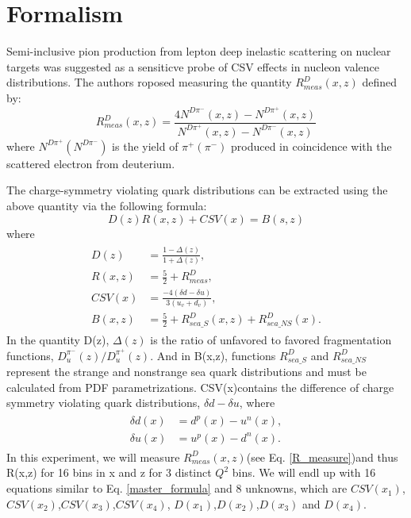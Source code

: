 \documentclass[12pt]{article}
\begin{document}
\section{Formalism}

Semi-inclusive pion production from lepton deep inelastic scattering on nuclear targets was suggested\cite{Baldit:1994jk, PhysRevLett.80.3715,PhysRevD.64.052002} as a sensiticve probe of CSV effects in nucleon valence distributions. The authors roposed measuring the quantity $R^D_{meas} (x,z) $ defined by:
\begin{equation}\label{R_measure}
    R^D_{meas}(x,z) = \frac{4N^{D\pi^-}(x,z) - N^{D\pi^+}(x,z)}{N^{D\pi^+}(x,z)-N^{D\pi^-}(x,z)}
\end{equation}
where $N^{D\pi^+}(N^{D\pi^-})$ is the yield of $\pi^+(\pi^-)$ produced in coincidence with the scattered electron from deuterium. 

The charge-symmetry violating quark distributions can be extracted using the above quantity via the following formula:
\begin{equation}\label{master_formula}
    D(z)R(x,z)+CSV(x) = B(s,z)
\end{equation}
where
\begin{align}
\begin{split}
    D(z) &=\frac{1-\Delta(z)}{1+\Delta(z)}, \\
    R(x,z) &= \frac{5}{2} +R^D_{meas}, \\
    CSV(x) &= \frac{-4(\delta d - \delta u)}{3(u_v+d_v)}, \\
    B(x,z) &= \frac{5}{2} + R^D_{sea\_S}(x,z)+R^D_{sea\_NS}(x).
\end{split}        
\end{align}
In the quantity D(z), $\Delta(z)$ is the ratio of unfavored to favored fragmentation functions, $D^{\pi^-}_u(z)/D^{\pi^+}_u(z)$. And in B(x,z), functions $R^D_{sea\_S}$ and $R^D_{sea\_NS}$ represent the strange and nonstrange sea quark distributions and must be calculated from PDF parametrizations. CSV(x)contains the difference of charge symmetry violating quark distributions, $\delta d-\delta u$, where
\begin{align}\label{CSV(X)}
    \begin{split}
          \delta d(x) &= d^p(x) - u^n(x), \\
          \delta u(x) &= u^p(x) - d^n(x).
    \end{split}
\end{align}
 In this experiment, we will measure $R^D_{meas}(x,z)$(see Eq. \eqref{R_measure})and thus R(x,z) for 16 bins in x and z for 3 distinct $Q^2$ bins. We will endl up with 16 equations similar to Eq. \eqref{master_formula} and 8 unknowns, which are $CSV(x_1)$,$CSV(x_2)$,$CSV(x_3)$,$CSV(x_4)$, $D(x_1)$,$D(x_2)$,$D(x_3)$ and $D(x_4)$. 
 
\end{document}
